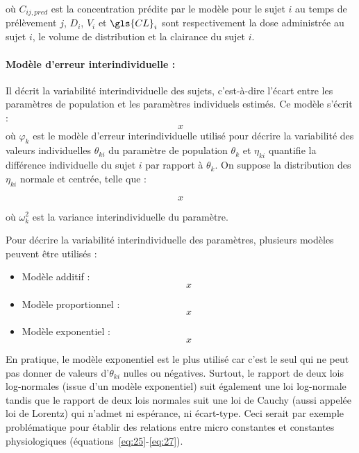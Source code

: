 où $C_{ij,pred}$ est la concentration prédite par le modèle pour le sujet $i$ au temps de prélèvement $j$, $D_i$, $V_i$ et $\gls{CL}_i$ sont respectivement la dose administrée au sujet $i$, le volume de distribution et la clairance du sujet $i$.

\paragraph*{Modèle d'erreur interindividuelle :} Il décrit la variabilité interindividuelle des sujets, c'est-à-dire l'écart entre les paramètres de population et les paramètres individuels estimés. Ce modèle s'écrit :
\begin{equation}
x
\label{eq:38}
\end{equation}
où $\varphi_k$ est le modèle d'erreur interindividuelle utilisé pour décrire la variabilité des valeurs individuelles $\theta_{ki}$ du paramètre de population $\theta_k$ et  $\eta_{ki}$ quantifie la différence individuelle du sujet $i$ par rapport à $\theta_k$. On suppose la distribution des $\eta_{ki}$ normale et centrée, telle que :

\begin{equation}
x
\label{eq:39}
\end{equation}

où $\omega_k^2$ est la variance interindividuelle du paramètre.

Pour décrire la variabilité interindividuelle des paramètres, plusieurs modèles peuvent être utilisés :

\begin{itemize}
\item Modèle additif :
\begin{equation}
x
\label{eq:40}
\end{equation}

\item Modèle proportionnel :
\begin{equation}
x
\label{eq:41}
\end{equation}

\item Modèle exponentiel :
\begin{equation}
x
\label{eq:42}
\end{equation}
 
\end{itemize}

En pratique, le modèle exponentiel est le plus utilisé car c'est le seul qui ne peut pas donner de valeurs d'$\theta_{ki}$ nulles ou négatives. Surtout, le rapport de deux lois log-normales (issue d'un modèle exponentiel) suit également une loi log-normale tandis que le rapport de deux lois normales suit une loi de Cauchy (aussi appelée loi de Lorentz) qui n'admet ni espérance, ni écart-type. Ceci serait par exemple problématique pour établir des relations entre micro constantes et constantes physiologiques (équations~\ref{eq:25}-\ref{eq:27}). 

